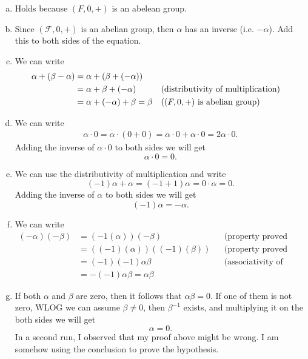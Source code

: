 \begin{problem} 
	\begin{solution}
		\begin{enumerate}[(a)]
			\item Holds because $ (F,0,+) $ is an abelean group.
			\item Since $ (\mathcal{F},0,+) $ is an abelian group, then $ \alpha $ has an inverse (i.e. $ -\alpha $). Add this to both sides of the equation.
			\item We can write
			\begin{align*}
				\alpha + (\beta - \alpha) &= \alpha + (\beta + (-\alpha)) \\
				&= \alpha + \beta + (-\alpha) && \text{(distributivity of multiplication)} \\
				&= \alpha + (-\alpha) + \beta = \beta && \text{($ (F,0,+) $ is abelian group)}
			\end{align*}
			\item We can write
			\begin{align*}
				\alpha\cdot0 = \alpha \cdot (0 + 0) = \alpha\cdot 0 + \alpha\cdot 0 = 2\alpha\cdot 0.
			\end{align*}
			Adding the inverse of $ \alpha\cdot 0 $ to both sides we will get
			\[ \alpha\cdot0 = 0. \]
			\item We can use the distributivity of multiplication and write
			\[ (-1)\alpha + \alpha = (-1 + 1)\alpha = 0\cdot\alpha = 0. \]
			Adding the inverse of $ \alpha $ to both sides we will get
			\[ (-1)\alpha = -\alpha. \]
			
			\item We can write
			\begin{align*}
				(-\alpha)(-\beta) &= (-1(\alpha))(-\beta)  && \text{(property proved above)} \\
				&= ((-1)(\alpha))((-1)(\beta)) && \text{(property proved above)} \\
				&= (-1)(-1)\alpha\beta && \text{(associativity of product)} \\
				&= -(-1 )\alpha \beta = \alpha\beta
			\end{align*}
			
			\item If both $ \alpha $ and $ \beta $ are zero, then it follows that $ \alpha\beta = 0 $. If one of them is not zero, WLOG we can assume $ \beta \neq 0 $, then $ \beta^{-1} $ exists, and multiplying it on the both sides we will get 
			\[ \alpha = 0. \]
			{\color{red} \noindent In a second run, I observed that my proof above might be wrong. I am somehow using the conclusion to prove the hypothesis.}
		\end{enumerate}
	\end{solution}
\end{problem}


